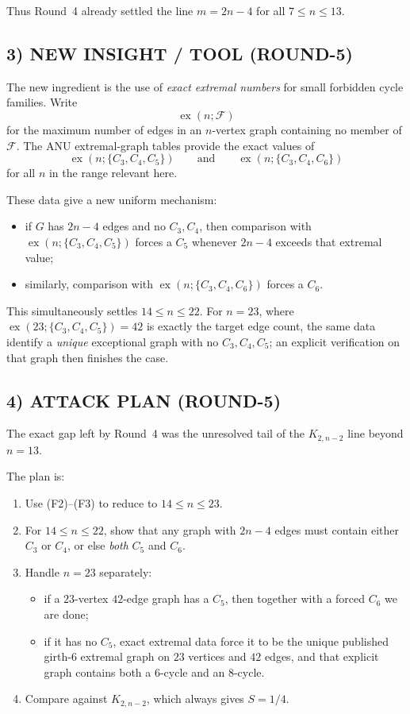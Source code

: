 Thus Round~4 already settled the line $m=2n-4$ for all $7\le n\le 13$.

\subsection*{3) NEW INSIGHT / TOOL (ROUND-5)}

The new ingredient is the use of \emph{exact extremal numbers} for small forbidden cycle families.
Write
\[
\operatorname{ex}(n;\mathcal F)
\]
for the maximum number of edges in an $n$-vertex graph containing no member of $\mathcal F$.
The ANU extremal-graph tables provide the exact values of
\[
\operatorname{ex}(n;\{C_3,C_4,C_5\})
\qquad\text{and}\qquad
\operatorname{ex}(n;\{C_3,C_4,C_6\})
\]
for all $n$ in the range relevant here.

These data give a new uniform mechanism:
\begin{itemize}
\item if $G$ has $2n-4$ edges and no $C_3,C_4$, then comparison with $\operatorname{ex}(n;\{C_3,C_4,C_5\})$ forces a $C_5$ whenever $2n-4$ exceeds that extremal value;
\item similarly, comparison with $\operatorname{ex}(n;\{C_3,C_4,C_6\})$ forces a $C_6$.
\end{itemize}

This simultaneously settles $14\le n\le 22$.
For $n=23$, where $\operatorname{ex}(23;\{C_3,C_4,C_5\})=42$ is exactly the target edge count, the same data identify a \emph{unique} exceptional graph with no $C_3,C_4,C_5$; an explicit verification on that graph then finishes the case.

\subsection*{4) ATTACK PLAN (ROUND-5)}

The exact gap left by Round~4 was the unresolved tail of the $K_{2,n-2}$ line beyond $n=13$.

The plan is:
\begin{enumerate}
\item Use (F2)--(F3) to reduce to $14\le n\le 23$.
\item For $14\le n\le 22$, show that any graph with $2n-4$ edges must contain either $C_3$ or $C_4$, or else \emph{both} $C_5$ and $C_6$.
\item Handle $n=23$ separately:
  \begin{itemize}
  \item if a $23$-vertex $42$-edge graph has a $C_5$, then together with a forced $C_6$ we are done;
  \item if it has no $C_5$, exact extremal data force it to be the unique published girth-$6$ extremal graph on $23$ vertices and $42$ edges, and that explicit graph contains both a $6$-cycle and an $8$-cycle.
  \end{itemize}
\item Compare against $K_{2,n-2}$, which always gives $S=1/4$.
\end{enumerate}

